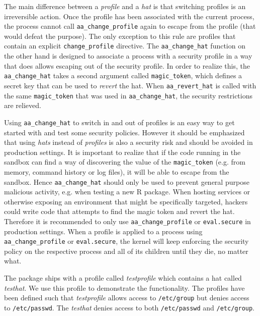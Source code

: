 \documentclass[article]{jss}
\newcommand{\R}{\textsf{R}\xspace}
\newcommand{\RAppArmor}{\pkg{RAppArmor}\xspace}
\begin{document}
The main difference between a \emph{profile} and a \emph{hat} is that switching
profiles is an irreversible action. Once the profile has been associated with
the current process, the process cannot call \texttt{aa\_change\_profile} again
to escape from the profile (that would defeat the purpose). The only exception
to this rule are profiles that contain an explicit \texttt{change\_profile}
directive. The \texttt{aa\_change\_hat} function on the other hand is designed to
associate a process with a security profile in a way that does allows escaping
out of the security profile. In order to realize this, the
\texttt{aa\_change\_hat} takes a second argument called \texttt{magic\_token},
which defines a secret key that can be used to \emph{revert} the hat. When
\texttt{aa\_revert\_hat} is called with the same \texttt{magic\_token} that
was used in \texttt{aa\_change\_hat}, the security restrictions are
relieved.

Using \texttt{aa\_change\_hat} to switch in and out of profiles is an easy way
to get started with \RAppArmor and test some security policies. However it
should be emphasized that using \emph{hats} instead of \emph{profiles} is also a
security risk and should be avoided in production settings. It is important to
realize that if the code running in the sandbox can find a way of discovering
the value of the \texttt{magic\_token} (e.g. from memory, command history or log
files), it will be able to escape from the sandbox. Hence
\texttt{aa\_change\_hat} should only be used to prevent general purpose
malicious activity, e.g. when testing a new \R package. When hosting services
or otherwise exposing an environment that might be specifically targeted,
hackers could write code that attempts to find the magic token and revert the
hat. Therefore it is recommended to only use \texttt{aa\_change\_profile} or
\texttt{eval.secure} in production settings. When a profile is applied to a
process using \texttt{aa\_change\_profile} or \texttt{eval.secure}, the kernel
will keep enforcing the security policy on the respective process and all of its
children until they die, no matter what.

The \RAppArmor package ships with a profile called \emph{testprofile} which
contains a hat called \emph{testhat}. We use this profile to demonstrate the
functionality. The profiles have been defined such that \emph{testprofile}
allows access to \texttt{/etc/group} but denies access to \texttt{/etc/passwd}.
The \emph{testhat} denies access to both \texttt{/etc/passwd} and
\texttt{/etc/group}.
\end{document}
